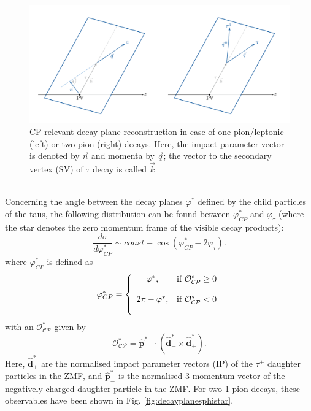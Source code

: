 \begin{figure}[h]
	\centering
	\includegraphics[width=0.9\linewidth]{Figures/Claudia_decay_planes}
	\caption{CP-relevant decay plane reconstruction in case of one-pion/leptonic (left) or two-pion (right) decays. Here, the impact parameter vector is denoted by $\vec{n}$ and momenta by $\vec{q}$; the vector to the secondary vertex (SV) of $\tau$ decay is called $\vec{k}$ \parencite{Claudia_thesis}}
	\label{fig:claudiadecayplanes}
\end{figure}\\
Concerning the angle between the decay planes $\varphi^*$ defined by the child particles of the taus, the following distribution can be found between $\varphi_{CP}^*$ and $\varphi_\tau$ (where the star denotes the zero momentum frame of the visible decay products):
\begin{equation}
	\label{eq:CP_Star_Distribution}
	\frac{d\sigma}{d\varphi_{CP}^*} \sim const - \cos(\varphi_{CP}^*-2\varphi_\tau).
\end{equation}
where $\varphi_{CP}^*$ is defined as
\begin{equation}
	\varphi_{CP}^* = \left\lbrace\begin{array}{cc}
	\varphi^*, \bigskip &\text{if } \mathcal{O_{CP}^*}\geq 0\\
	2\pi-\varphi^*, \bigskip &\text{if } \mathcal{O_{CP}^*}< 0
	\end{array}\right.
\end{equation}
with an $\mathcal{O_{CP}^*}$ given by
\begin{equation}
	\mathcal{O_{CP}^*} = \boldsymbol{\hat{p}^*}_- \cdot (\boldsymbol{\hat{d}}_-^*\times\boldsymbol{\hat{d}}_+^*).
\end{equation}
Here, $\boldsymbol{\hat{d}_\pm^*}$ are the normalised impact parameter vectors (IP) of the $\tau^\pm$ daughter particles in the ZMF, and $\boldsymbol{\hat{p}}_-^*$ is the normalised 3-momentum vector of the negatively charged daughter particle in the ZMF. For two 1-pion decays, these observables have been shown in Fig. \ref{fig:decayplanesphistar}.
